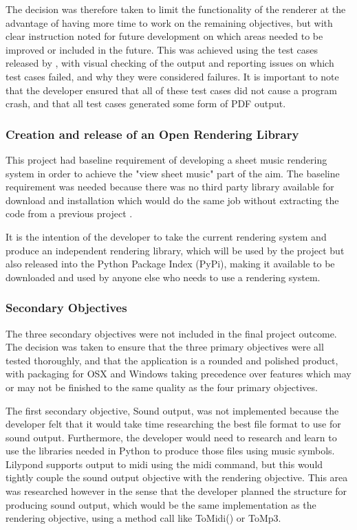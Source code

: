 The decision was therefore taken to limit the functionality of the renderer at the advantage of having more time to work on the remaining objectives, but with clear instruction noted for future development on which areas needed to be improved or included in the future. This was achieved using the test cases released by \cite{Lilypond}, with visual checking of the output and reporting issues on which test cases failed, and why they were considered failures. It is important to note that the developer ensured that all of these test cases did not cause a program crash, and that all test cases generated some form of PDF output.

\subsubsection{Creation and release of an Open Rendering Library}
This project had baseline requirement of developing a sheet music rendering system in order to achieve the "view sheet music" part of the aim.  The baseline requirement was needed because there was no third party library available for download and installation which would do the same job without extracting the code from a previous project \parencite{pypi}.

It is the intention of the developer to take the current rendering system and produce an independent rendering library, which will be used by the project but also released into the Python Package Index (PyPi), making it available to be downloaded and used by anyone else who needs to use a rendering system.

\subsubsection{Secondary Objectives}
The three secondary objectives were not included in the final project outcome.  The decision was taken to ensure that the three primary objectives were all tested thoroughly, and that the application is a rounded and polished product, with packaging for OSX and Windows taking precedence over features which may or may not be finished to the same quality as the four primary objectives. 

The first secondary objective, Sound output, was not implemented because the developer felt that it would take time researching the best file format to use for sound output. Furthermore, the developer would need to research and learn to use the libraries needed in Python to produce those files using music symbols. Lilypond supports output to midi using the midi command, but this would tightly couple the sound output objective with the rendering objective. This area was researched however in the sense that the developer planned the structure for producing sound output, which would be the same implementation as the rendering objective, using a method call like ToMidi() or ToMp3.

